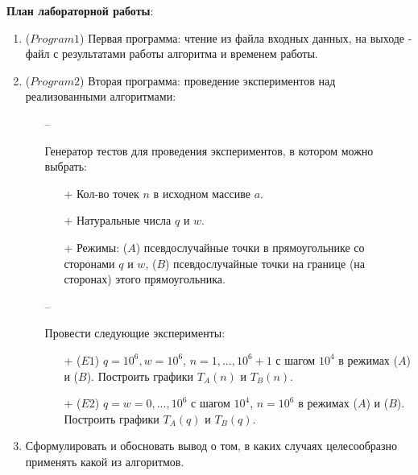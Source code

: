 \noindent \textbf{План лабораторной работы}:
\begin{enumerate}
	\item{($Program1$) Первая программа: чтение из файла входных данных, на выходе - файл с результатами работы алгоритма и временем работы.}
	\item{($Program2$) Вторая программа: проведение экспериментов над реализованными алгоритмами:
		\begin{itemize}
			\item[--]{Генератор тестов для проведения экспериментов, в котором можно выбрать:
				\begin{itemize}
					\item[+]{Кол-во точек $n$ в исходном массиве $a$.}
					\item[+]{Натуральные числа $q$ и $w$.}
					\item[+]{Режимы: ($A$) псевдослучайные точки в прямоугольнике со сторонами $q$ и $w$, ($B$) псевдослучайные точки на границе (на сторонах) этого прямоугольника.}
			\end{itemize}}
			\item[--]{Провести следующие эксперименты:
				\begin{itemize}
					\item[+]{($E1$) $q = 10^6, w = 10^6$, $n = 1, ..., 10^6+1$ с шагом $10^4$ в режимах ($A$) и ($B$). Построить графики $T_A(n)$ и $T_B(n)$.}
					\item[+]{($E2$) $q = w = 0, ..., 10^6$ с шагом $10^4$, $n = 10^6$ в режимах ($A$) и ($B$). Построить графики $T_A(q)$ и $T_B(q)$.}
			\end{itemize}}
		\end{itemize}
	}
	\item{Сформулировать и обосновать вывод о том, в каких случаях целесообразно применять какой из алгоритмов.}
\end{enumerate}

